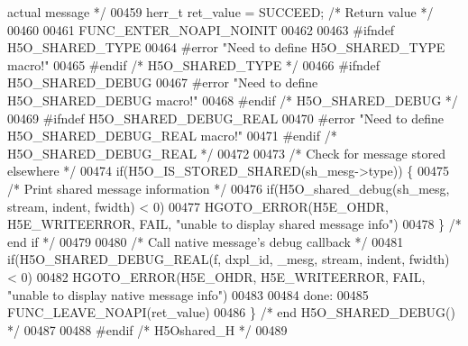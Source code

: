 \begin{DoxyCode}
{       actual message */}
00459     herr\_t ret\_value = SUCCEED;           \textcolor{comment}{/* Return value */}
00460 
00461     FUNC\_ENTER\_NOAPI\_NOINIT
00462 
00463 \textcolor{preprocessor}{#ifndef H5O\_SHARED\_TYPE}
00464 \textcolor{preprocessor}{#error "Need to define H5O\_SHARED\_TYPE macro!"}
00465 \textcolor{preprocessor}{#endif }\textcolor{comment}{/* H5O\_SHARED\_TYPE */}\textcolor{preprocessor}{}
00466 \textcolor{preprocessor}{#ifndef H5O\_SHARED\_DEBUG}
00467 \textcolor{preprocessor}{#error "Need to define H5O\_SHARED\_DEBUG macro!"}
00468 \textcolor{preprocessor}{#endif }\textcolor{comment}{/* H5O\_SHARED\_DEBUG */}\textcolor{preprocessor}{}
00469 \textcolor{preprocessor}{#ifndef H5O\_SHARED\_DEBUG\_REAL}
00470 \textcolor{preprocessor}{#error "Need to define H5O\_SHARED\_DEBUG\_REAL macro!"}
00471 \textcolor{preprocessor}{#endif }\textcolor{comment}{/* H5O\_SHARED\_DEBUG\_REAL */}\textcolor{preprocessor}{}
00472 
00473     \textcolor{comment}{/* Check for message stored elsewhere */}
00474     \textcolor{keywordflow}{if}(H5O\_IS\_STORED\_SHARED(sh\_mesg->type)) \{
00475         \textcolor{comment}{/* Print shared message information */}
00476         \textcolor{keywordflow}{if}(H5O\_shared\_debug(sh\_mesg, stream, indent, fwidth) < 0)
00477             HGOTO\_ERROR(H5E\_OHDR, H5E\_WRITEERROR, FAIL, \textcolor{stringliteral}{"unable to display shared message info"})
00478     \} \textcolor{comment}{/* end if */}
00479 
00480     \textcolor{comment}{/* Call native message's debug callback */}
00481     \textcolor{keywordflow}{if}(H5O\_SHARED\_DEBUG\_REAL(f, dxpl\_id, \_mesg, stream, indent, fwidth) < 0)
00482         HGOTO\_ERROR(H5E\_OHDR, H5E\_WRITEERROR, FAIL, \textcolor{stringliteral}{"unable to display native message info"})
00483 
00484 done:
00485     FUNC\_LEAVE\_NOAPI(ret\_value)
00486 \} \textcolor{comment}{/* end H5O\_SHARED\_DEBUG() */}
00487 
00488 \textcolor{preprocessor}{#endif }\textcolor{comment}{/* H5Oshared\_H */}\textcolor{preprocessor}{}
00489 
\end{DoxyCode}
